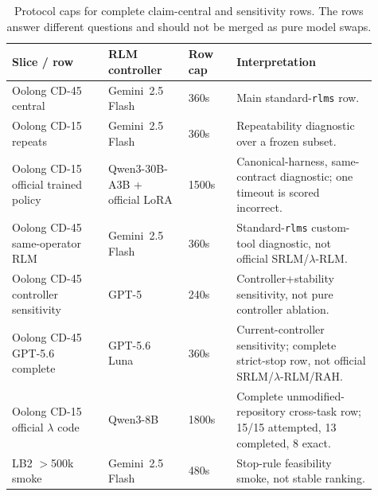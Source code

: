 \begin{table}[!t]
\centering
\small
\setlength{\tabcolsep}{3pt}
\begin{tabular}{@{}L{0.24\linewidth}L{0.20\linewidth}L{0.12\linewidth}L{0.35\linewidth}@{}}
\toprule
\textbf{Slice / row} & \textbf{RLM controller} & \textbf{Row cap} & \textbf{Interpretation} \\
\midrule
Oolong CD-45 central & Gemini~2.5 Flash & 360s & Main standard-\texttt{rlms} row. \\
Oolong CD-15 repeats & Gemini~2.5 Flash & 360s & Repeatability diagnostic over a frozen subset. \\
Oolong CD-15 official trained policy & Qwen3-30B-A3B + official LoRA & 1500s & Canonical-harness, same-contract diagnostic; one timeout is scored incorrect. \\
Oolong CD-45 same-operator RLM & Gemini~2.5 Flash & 360s & Standard-\texttt{rlms} custom-tool diagnostic, not official SRLM/$\lambda$-RLM. \\
Oolong CD-45 controller sensitivity & GPT-5 & 240s & Controller+stability sensitivity, not pure controller ablation. \\
Oolong CD-45 GPT-5.6 complete & GPT-5.6 Luna & 360s & Current-controller sensitivity; complete strict-stop row, not official SRLM/$\lambda$-RLM/RAH. \\
Oolong CD-15 official $\lambda$ code & Qwen3-8B & 1800s & Complete unmodified-repository cross-task row; 15/15 attempted, 13 completed, 8 exact. \\
LB2 $>$500k smoke & Gemini~2.5 Flash & 480s & Stop-rule feasibility smoke, not stable ranking. \\
\bottomrule
\end{tabular}
\caption{Protocol caps for complete claim-central and sensitivity rows. The rows answer different questions and should not be merged as pure model swaps.}
\label{tab:supp-protocol-caps}
\end{table}

